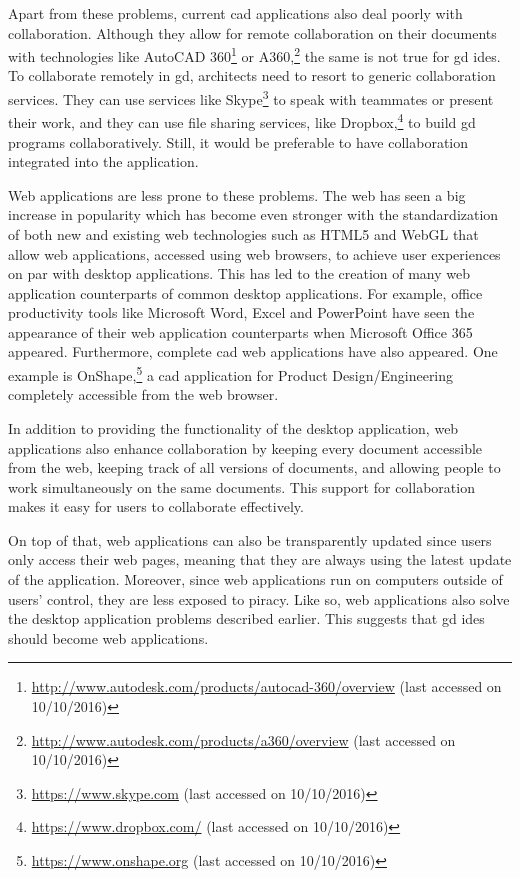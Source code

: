 Apart from these problems, current \gls{cad} applications also deal poorly with collaboration.
Although they allow for remote collaboration on their documents with technologies like AutoCAD 360\footnote{\url{http://www.autodesk.com/products/autocad-360/overview} (last accessed on 10/10/2016)} or A360,\footnote{\url{http://www.autodesk.com/products/a360/overview} (last accessed on 10/10/2016)} the same is not true for \gls{gd} \glspl{ide}.
To collaborate remotely in \gls{gd}, architects need to resort to generic collaboration services.
They can use services like Skype\footnote{\url{https://www.skype.com} (last accessed on 10/10/2016)} to speak with teammates or present their work, and they can use file sharing services, like Dropbox,\footnote{\url{https://www.dropbox.com/} (last accessed on 10/10/2016)} to build \gls{gd} programs collaboratively.
Still, it would be preferable to have collaboration integrated into the application.

Web applications are less prone to these problems.
The web has seen a big increase in popularity which has become even stronger with the standardization of both new and existing web technologies such as HTML5\cite{hickson2011html5} and WebGL\cite{marrin2011webgl} that allow web applications, accessed using web browsers, to achieve user experiences on par with desktop applications.
This has led to the creation of many web application counterparts of common desktop applications.
For example, office productivity tools like Microsoft Word, Excel and PowerPoint have seen the appearance of their web application counterparts when Microsoft Office 365 appeared.
Furthermore, complete \gls{cad} web applications have also appeared.
One example is OnShape,\footnote{\url{https://www.onshape.org} (last accessed on 10/10/2016)} a \gls{cad} application for Product Design/Engineering completely accessible from the web browser.

In addition to providing the functionality of the desktop application, web applications also enhance collaboration by keeping every document accessible from the web, keeping track of all versions of documents, and allowing people to work simultaneously on the same documents.
This support for collaboration makes it easy for users to collaborate effectively.

On top of that, web applications can also be transparently updated since users only access their web pages, meaning that they are always using the latest update of the application. Moreover, since web applications run on computers outside of users' control, they are less exposed to piracy. Like so, web applications also solve the desktop application problems described earlier.
This suggests that \gls{gd} \glspl{ide} should become web applications.

